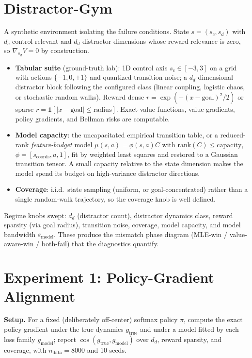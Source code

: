 \documentclass[11pt]{article}
\begin{document}
\section{Distractor-Gym}

A synthetic environment isolating the failure conditions. State $s = (s_c, s_d)$ with
$d_c$ control-relevant and $d_d$ distractor dimensions whose reward relevance is zero,
so $\nabla_{s_d} V = 0$ by construction.

\begin{itemize}
\item \textbf{Tabular suite} (ground-truth lab): 1D control axis $s_c \in [-3, 3]$ on a
  grid with actions $\{-1, 0, +1\}$ and quantized transition noise; a $d_d$-dimensional
  distractor block following the configured class (linear coupling, logistic chaos, or
  stochastic random walks). Reward dense
  $r = \exp\!\left(-(x - \mathrm{goal})^2/2\right)$ or sparse
  $r = \mathbf{1}[\lvert x - \mathrm{goal}\rvert \le \mathrm{radius}]$. Exact value
  functions, value gradients, policy gradients, and Bellman risks are computable.
\item \textbf{Model capacity}: the uncapacitated empirical transition table, or a
  reduced-rank \emph{feature-budget} model
  $\mu(s,a) = \phi(s,a) C$ with $\mathrm{rank}(C) \le \mathrm{capacity}$,
  $\phi = [s_{\text{coords}}, a, 1]$, fit by weighted least squares and restored to a
  Gaussian transition tensor. A small capacity relative to the state dimension makes the
  model spend its budget on high-variance distractor directions.
\item \textbf{Coverage}: i.i.d.\ state sampling (uniform, or goal-concentrated) rather
  than a single random-walk trajectory, so the coverage knob is well defined.
\end{itemize}

Regime knobs swept: $d_d$ (distractor count), distractor dynamics class, reward sparsity
(via goal radius), transition noise, coverage, model capacity, and model bandwidth
$\varepsilon_{\mathrm{model}}$. These produce the mismatch phase diagram
(MLE-win / value-aware-win / both-fail) that the diagnostics quantify.

\section{Experiment 1: Policy-Gradient Alignment}

\textbf{Setup.} For a fixed (deliberately off-center) softmax policy $\pi$, compute the
exact policy gradient under the true dynamics $g_{\text{true}}$ and under a model fitted
by each loss family $g_{\mathrm{model}}$; report
$\cos(g_{\text{true}}, g_{\mathrm{model}})$ over $d_d$, reward sparsity, and coverage,
with $n_{\text{data}} = 8000$ and 10 seeds.
\end{document}
